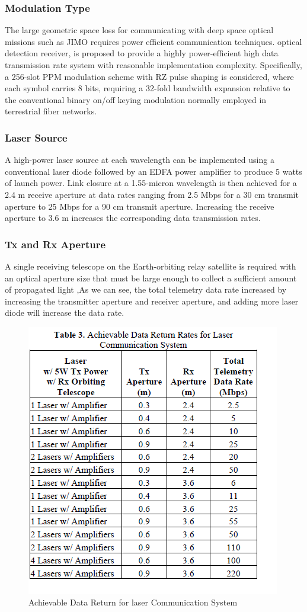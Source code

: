\subsubsection{Modulation Type}
The large geometric space loss for communicating with deep space optical missions such as JIMO requires power efficient communication techniques.
optical detection receiver, is proposed to provide a highly power-efficient high data transmission rate system with reasonable implementation complexity. Specifically, a 256-slot PPM modulation scheme with RZ pulse shaping is considered, where each symbol carries 8 bits, requiring a 32-fold bandwidth expansion relative to the conventional binary on/off keying modulation normally employed in terrestrial fiber networks.
\subsubsection{Laser Source}
A high-power laser source at each wavelength can be implemented using a conventional laser diode followed by an EDFA power amplifier to produce 5 watts of launch power. Link closure at a 1.55-micron wavelength is then achieved for a 2.4 m receive aperture at data rates ranging from 2.5 Mbps for a 30 cm transmit aperture to 25 Mbps for a 90 cm transmit aperture. Increasing the receive aperture to 3.6 m increases the corresponding data transmission rates.
\subsubsection{Tx and Rx Aperture}
A single receiving telescope on the Earth-orbiting relay satellite is required with an optical aperture size that must be large enough to collect a sufficient amount of propagated light ,As we can see, the total telemetry data rate increased by increasing the transmitter aperture and receiver aperture, and adding more laser diode will increase the data rate. 
\begin{figure}[htb]
\begin{center}
\includegraphics[width=0.7\columnwidth]{figures/laser-communication/bh5.png}
\caption{Achievable Data Return for laser Communication System}
\end{center}
\end{figure}
\noindent
\\
